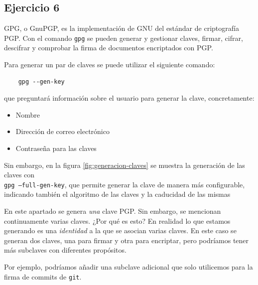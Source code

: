 \subsection{Ejercicio 6}
\graphicspath{ {img/06} }

GPG, o GnuPGP, es la implementación de GNU del estándar de criptografía PGP. Con el comando \texttt{gpg} se pueden generar y gestionar claves, firmar, cifrar, descifrar y comprobar la firma de documentos encriptados con PGP.

Para generar un par de claves se puede utilizar el siguiente comando:
\begin{verbatim}
    gpg --gen-key
\end{verbatim}

que preguntará información sobre el usuario para generar la clave, concretamente:
\begin{itemize}
    \item{Nombre}
    \item{Dirección de correo electrónico}
    \item{Contraseña para las claves}
\end{itemize}

Sin embargo, en la figura \ref{fig:generacion-claves} se muestra la generación de las claves con \\ \texttt{gpg --full-gen-key}, que permite generar la clave de manera más configurable, indicando también el algoritmo de las claves y la caducidad de las mismas

\begin{tcolorbox}[
    colback=orange!5!white,
    colframe=orange!75!black,
    title=Puntualización
]
    En este apartado se genera \textit{una} clave PGP. Sin embargo, se mencionan continuamente varias claves. ¿Por qué es esto?
    \tcblower
    En realidad lo que estamos generando es una \textit{identidad} a la que se asocian varias claves. En este caso se generan dos claves, una para firmar y otra para encriptar, pero podríamos tener más subclaves con diferentes propósitos.

    Por ejemplo, podríamos añadir una subclave adicional que solo utilicemos para la firma de commits de \texttt{git}.
\end{tcolorbox}

